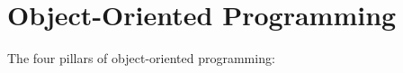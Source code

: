 \section{Object-Oriented Programming}

The four pillars of object-oriented programming:
\begin{enumerate}
\end{enumerate}

